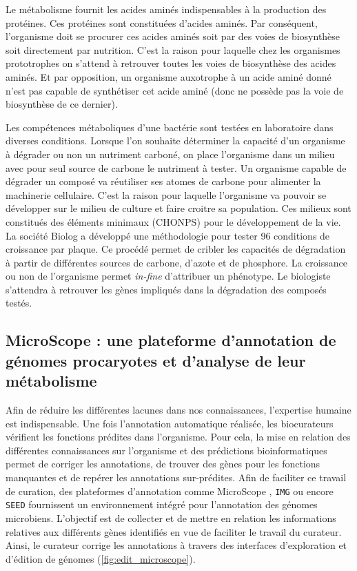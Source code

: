 \begin{refsegment}
    Le métabolisme fournit les acides aminés indispensables à la production des protéines. Ces protéines sont constituées d'acides aminés. Par conséquent, l'organisme doit se procurer ces acides aminés soit par des voies de biosynthèse soit directement par nutrition. C'est la raison pour laquelle chez les organismes prototrophes on s'attend à retrouver toutes les voies de biosynthèse des acides aminés. Et par opposition, un organisme auxotrophe à un acide aminé donné n'est pas capable de synthétiser cet acide aminé (donc ne possède pas  la voie de biosynthèse de ce dernier).
    
    Les compétences métaboliques d'une bactérie sont testées en laboratoire dans diverses conditions. Lorsque l'on souhaite déterminer la capacité d'un organisme à dégrader ou non un nutriment carboné, on place l'organisme dans un milieu avec pour seul source de carbone le nutriment à tester. Un organisme capable de dégrader un composé va réutiliser ses atomes de carbone pour alimenter la machinerie cellulaire. C'est la raison pour laquelle l'organisme va pouvoir se développer sur le milieu de culture et faire croitre sa population. Ces milieux sont constitués des éléments minimaux (\gls{CHONPS}) pour le développement de la vie. La société Biolog \cite{bochner2009global} a développé une méthodologie pour tester 96 conditions de croissance par plaque. Ce procédé permet de cribler les capacités de dégradation à partir de différentes sources de carbone, d'azote et de phosphore. La croissance ou non de l'organisme permet \textit{in-fine} d'attribuer un phénotype. Le biologiste s'attendra à retrouver les gènes impliqués dans la dégradation des composés testés.
    
    \subsection{MicroScope : une plateforme d'annotation de génomes procaryotes et d'analyse de leur métabolisme}
    
    Afin de réduire les différentes lacunes dans nos connaissances, l'expertise humaine est indispensable. Une fois l'annotation automatique réalisée, les biocurateurs vérifient les fonctions prédites dans l'organisme. Pour cela, la mise en relation des différentes connaissances sur l'organisme et des prédictions bioinformatiques permet de corriger les annotations, de trouver des gènes pour les fonctions manquantes et de repérer les annotations sur-prédites. Afin de faciliter ce travail de curation, des plateformes d'annotation comme MicroScope \cite{vallenet2016microscope,Belda2017}, \texttt{\gls{IMG}} \cite{markowitz2009img,markowitz2012img} ou encore \texttt{SEED} \cite{overbeek2004seed,overbeek2014seed} fournissent un environnement intégré pour l'annotation des génomes microbiens. L'objectif est de collecter et de mettre en relation les informations relatives aux différents gènes identifiés en vue de faciliter le travail du curateur. Ainsi, le curateur corrige les annotations à travers des interfaces d'exploration et d'édition de génomes (\cref{fig:edit_microscope}).
    

\end{refsegment}

